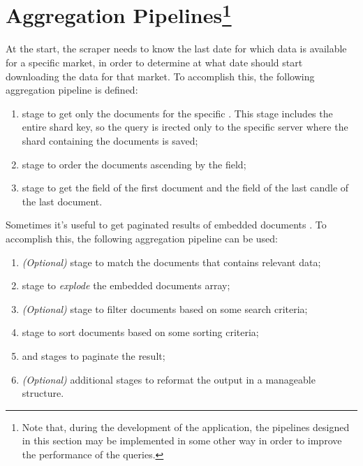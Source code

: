 \section[Aggregation Pipelines]{Aggregation Pipelines\footnote{Note that, during
the development of the application, the pipelines designed in this section may
be implemented in some other way  in order to improve the performance of the
queries.}}\label{sec:aggregations}

At the start, the scraper needs to know the last date for which data is
available for a specific market, in order to determine at what date should start
downloading the data for that market. To accomplish this, the following
aggregation pipeline is defined:
\begin{enumerate}
	\item {} stage to get only the documents for the specific
		. This stage includes the entire shard key, so the
		query is irected only to the specific server where the shard
		containing the documents is saved;
	\item {} stage to order the documents ascending by the
		 field;
	\item {} stage to get the  field of the first
		document and the  field of the last candle of
		the last document.
\end{enumerate}

Sometimes it's useful to get paginated results of embedded documents
.
To accomplish this, the following aggregation pipeline can be used:
\begin{enumerate}
	\item \textit{(Optional)}  stage to match the documents
		that contains relevant data;
	\item {} stage to \emph{explode} the embedded documents
		array;
	\item \textit{(Optional)}  stage to filter documents based
		on some search criteria;
	\item {} stage to sort documents based on some sorting
		criteria;
	\item {} and  stages to paginate the result;
	\item \textit{(Optional)} additional stages to reformat the output in a
		manageable structure.
\end{enumerate}

